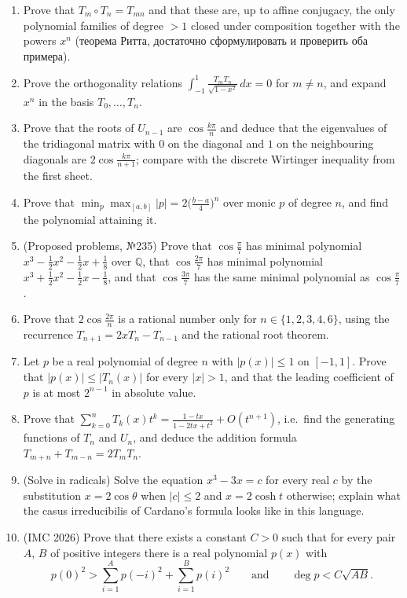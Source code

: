 \documentclass[11pt,a4paper]{article}
\renewcommand{\le}{\leqslant}
\begin{document}
\begin{enumerate}[itemsep=0.6em]
\item Prove that $T_m\circ T_n=T_{mn}$ and that these are, up to affine conjugacy, the only
polynomial families of degree $>1$ closed under composition together with the powers $x^n$
(\foreignlanguage{russian}{теорема Ритта, достаточно сформулировать и проверить оба примера}).

\item Prove the orthogonality relations $\int_{-1}^1\frac{T_mT_n}{\sqrt{1-x^2}}\,dx=0$ for $m\ne n$,
and expand $x^n$ in the basis $T_0,\dots,T_n$.

\item Prove that the roots of $U_{n-1}$ are $\cos\frac{k\pi}{n}$ and deduce that the eigenvalues of
the tridiagonal matrix with $0$ on the diagonal and $1$ on the neighbouring diagonals are
$2\cos\frac{k\pi}{n+1}$; compare with the discrete Wirtinger inequality from the first sheet.

\item Prove that $\min_p\max_{[a,b]}|p|=2\bigl(\frac{b-a}{4}\bigr)^n$ over monic $p$ of degree $n$,
and find the polynomial attaining it.

\item (Proposed problems, \foreignlanguage{russian}{№}235) Prove that $\cos\frac{\pi}{7}$ has minimal
polynomial $x^3-\frac12x^2-\frac12x+\frac18$ over $\mathbb Q$, that $\cos\frac{2\pi}{7}$ has minimal
polynomial $x^3+\frac12x^2-\frac12x-\frac18$, and that $\cos\frac{3\pi}{7}$ has the same minimal
polynomial as $\cos\frac{\pi}{7}$.

\item Prove that $2\cos\frac{2\pi}{n}$ is a rational number only for $n\in\{1,2,3,4,6\}$, using the
recurrence $T_{n+1}=2xT_n-T_{n-1}$ and the rational root theorem.

\item Let $p$ be a real polynomial of degree $n$ with $|p(x)|\le1$ on $[-1,1]$. Prove that
$|p(x)|\le|T_n(x)|$ for every $|x|>1$, and that the leading coefficient of $p$ is at most $2^{n-1}$
in absolute value.

\item Prove that $\sum_{k=0}^nT_k(x)t^k=\frac{1-tx}{1-2tx+t^2}+O(t^{n+1})$, i.e.\ find the generating
functions of $T_n$ and $U_n$, and deduce the addition formula $T_{m+n}+T_{m-n}=2T_mT_n$.

\item (Solve in radicals) Solve the equation $x^3-3x=c$ for every real $c$ by the substitution
$x=2\cos\theta$ when $|c|\le2$ and $x=2\cosh t$ otherwise; explain what the casus irreducibilis of
Cardano's formula looks like in this language.

\item (IMC 2026) Prove that there exists a constant $C>0$ such that for every pair $A$, $B$ of
positive integers there is a real polynomial $p(x)$ with
\[
p(0)^2>\sum_{i=1}^{A}p(-i)^2+\sum_{i=1}^{B}p(i)^2\qquad\text{and}\qquad\deg p<C\sqrt{AB}.
\]
\end{enumerate}
\end{document}
